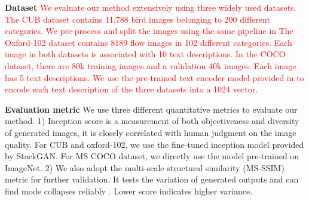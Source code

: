 \documentclass[10pt,twocolumn,letterpaper]{article}
\begin{document}
\textbf{Dataset} 
\textcolor{red}{We evaluate our method extensively using three widely used datasets. The CUB dataset \cite{welinder2010caltech} contains 11,788 bird images belonging to 200 different categories. We pre-process and split the images using the same pipeline in \cite{reed2016generative,han2017stackgan}
The Oxford-102 dataset \cite{Nilsback08} contains 8189 flow images in 102 different categories. 
Each image in both datasets is associated with 10 text descriptions. \textcolor{red}{In the COCO dataset, \cite{lin2014microsoft} there are 80k training images and a validation 40k images.  Each image has 5 text descriptions.  }
We use the pre-trained text encoder model provided in \cite{reed2016generative} to encode each text description of the three datasets into a 1024 vector.
}


\textbf{Evaluation metric}
We use three different quantitative metrics to evaluate our method.
1) Inception score \cite{improvedGAN} is a measurement of both objectiveness and diversity of generated images, it is closely correlated with human judgment on the image quality. For CUB and oxford-102, we use the fine-tuned inception model provided by StackGAN. For MS COCO dataset, we directly use the model pre-trained on ImageNet.
2) We also adopt the multi-scale structural similarity (MS-SSIM) metric \cite{improvedGAN} for further validation. It tests the variation of generated outputs and can find mode collapses reliably \cite{odena2016conditional}. Lower score indicates higher variance.
\end{document}
